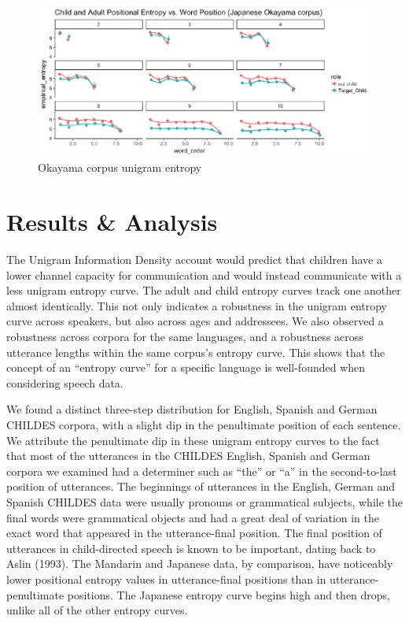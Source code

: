\documentclass[10pt, letterpaper]{article}
\newenvironment{CodeChunk}{}{}
\begin{document}
\begin{CodeChunk}
\begin{figure}[h]

{\centering \includegraphics{figs/okayama_PE-1} 

}

\caption[Okayama corpus unigram entropy]{Okayama corpus unigram entropy}\label{fig:okayama_PE}
\end{figure}
\end{CodeChunk}

\section{Results \& Analysis}\label{results-analysis}

The Unigram Information Density account would predict that children have
a lower channel capacity for communication and would instead communicate
with a less unigram entropy curve. The adult and child entropy curves
track one another almost identically. This not only indicates a
robustness in the unigram entropy curve across speakers, but also across
ages and addressees. We also observed a robustness across corpora for
the same languages, and a robustness across utterance lengths within the
same corpus's entropy curve. This shows that the concept of an ``entropy
curve'' for a specific language is well-founded when considering speech
data.

We found a distinct three-step distribution for English, Spanish and
German CHILDES corpora, with a slight dip in the penultimate position of
each sentence. We attribute the penultimate dip in these unigram entropy
curves to the fact that most of the utterances in the CHILDES English,
Spanish and German corpora we examined had a determiner such as ``the''
or ``a'' in the second-to-last position of utterances. The beginnings of
utterances in the English, German and Spanish CHILDES data were usually
pronouns or grammatical subjects, while the final words were grammatical
objects and had a great deal of variation in the exact word that
appeared in the utterance-final position. The final position of
utterances in child-directed speech is known to be important, dating
back to Aslin (1993). The Mandarin and Japanese data, by comparison,
have noticeably lower positional entropy values in utterance-final
positions than in utterance-penultimate positions. The Japanese entropy
curve begins high and then drops, unlike all of the other entropy
curves.
\end{document}
